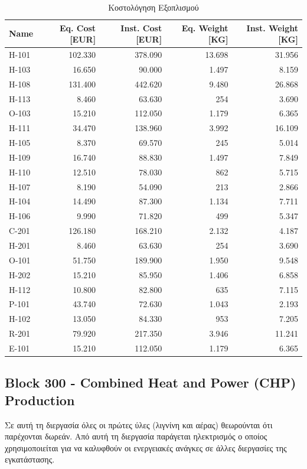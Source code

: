 \documentclass[11pt]{article}
\begin{document}
\begin{table}[htbp]
\caption{Κοστολόγηση Εξοπλισμού}
\centering
\begin{tabular}{lrrrr}
Name & Eq. Cost [EUR] & Inst. Cost [EUR] & Eq. Weight [KG] & Inst. Weight [KG]\\
\hline
H-101 & 102.330 & 378.090 & 13.698 & 31.956\\
H-103 & 16.650 & 90.000 & 1.497 & 8.159\\
H-108 & 131.400 & 442.620 & 9.480 & 26.868\\
H-113 & 8.460 & 63.630 & 254 & 3.690\\
O-103 & 15.210 & 112.050 & 1.179 & 6.365\\
H-111 & 34.470 & 138.960 & 3.992 & 16.109\\
H-105 & 8.370 & 69.570 & 245 & 5.014\\
H-109 & 16.740 & 88.830 & 1.497 & 7.849\\
H-110 & 12.510 & 78.030 & 862 & 5.715\\
H-107 & 8.190 & 54.090 & 213 & 2.866\\
H-104 & 14.490 & 87.300 & 1.134 & 7.711\\
H-106 & 9.990 & 71.820 & 499 & 5.347\\
C-201 & 126.180 & 168.210 & 2.132 & 4.187\\
H-201 & 8.460 & 63.630 & 254 & 3.690\\
O-101 & 51.750 & 189.900 & 1.950 & 9.548\\
H-202 & 15.210 & 85.950 & 1.406 & 6.858\\
H-112 & 10.800 & 82.800 & 635 & 7.115\\
P-101 & 43.740 & 72.630 & 1.043 & 2.193\\
H-102 & 13.050 & 84.330 & 953 & 7.205\\
R-201 & 79.920 & 217.350 & 3.946 & 11.241\\
E-101 & 15.210 & 112.050 & 1.179 & 6.365\\
\end{tabular}
\end{table}

\subsection{Block 300 - Combined Heat and Power (CHP) Production}
\label{sec:orgaf33564}
Σε αυτή τη διεργασία όλες οι πρώτες ύλες (λιγνίνη και αέρας) θεωρούνται
ότι παρέχονται δωρεάν. Από αυτή τη διεργασία παράγεται ηλεκτρισμός ο
οποίος χρησιμοποιείται για να καλυφθούν οι ενεργειακές ανάγκες σε άλλες
διεργασίες της εγκατάστασης.
\end{document}

